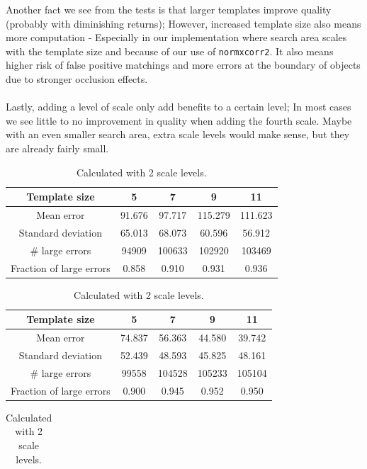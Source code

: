 \documentclass[12pt,a4paper,oneside,final]{article}
\begin{document}
Another fact we see from the tests is that larger templates improve quality (probably with diminishing returns); However, increased template size also means more computation - Especially in our implementation where search area scales with the template size and because of our use of \texttt{normxcorr2}. It also means higher risk of false positive matchings and more errors at the boundary of objects due to stronger occlusion effects.\\\\
{\color{red}
Lastly, adding a level of scale only add benefits to a certain level; In most cases we see little to no improvement in quality when adding the fourth scale. Maybe with an even smaller search area, extra scale levels would make sense, but they are already fairly small. }

\begin{table}[H]
	\centering
	\begin{subtable}{1\textwidth}
		\centering
		\begin{tabular}{c||c|c|c|c}
			Template size &5&7&9&11\\\hline
			Mean error &91.676&97.717&115.279&111.623\\\hline
			Standard deviation &65.013&68.073&60.596&56.912\\\hline
			\# large errors &94909&100633&102920&103469\\\hline
			Fraction of large errors &0.858&0.910&0.931&0.936\\\hline
		\end{tabular}
		\caption{Calculated with 1 scale level.}
	\end{subtable}
	\begin{subtable}{1\textwidth}
		\centering
		\begin{tabular}{c||c|c|c|c}
			Template size &5&7&9&11\\\hline
			Mean error &74.837&56.363&44.580&39.742\\\hline
			Standard deviation &52.439&48.593&45.825&48.161\\\hline
			\# large errors &99558&104528&105233&105104\\\hline
			Fraction of large errors &0.900&0.945&0.952&0.950\\\hline
		\end{tabular}
		\caption{Calculated with 2 scale levels.}
	\end{subtable}
	\begin{subtable}{1\textwidth}
		\centering
		\begin{tabular}{c||c|c|c|c}

\end{tabular}
\end{subtable}
\end{table}
\end{document}
